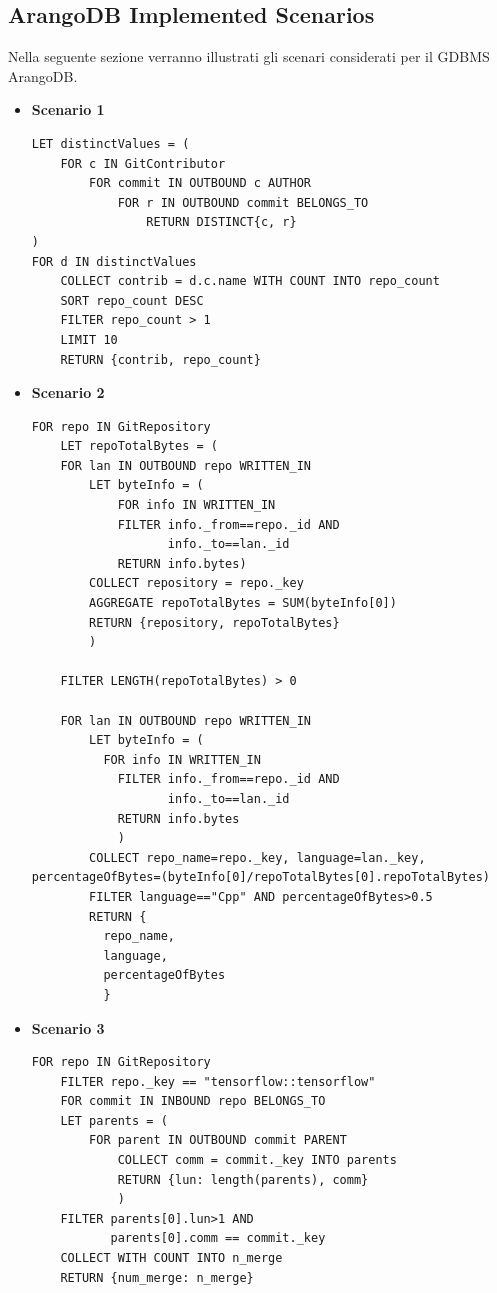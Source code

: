 \documentclass[11pt]{article}
\begin{document}
\subsection{ArangoDB Implemented Scenarios}
Nella seguente sezione verranno illustrati gli scenari considerati per il GDBMS ArangoDB. 
\begin{itemize}
    \item \textbf{Scenario 1}
    \begin{lstlisting}[style = all, style = ArangoStyle] 
LET distinctValues = (
    FOR c IN GitContributor
        FOR commit IN OUTBOUND c AUTHOR
            FOR r IN OUTBOUND commit BELONGS_TO
                RETURN DISTINCT{c, r}
)
FOR d IN distinctValues
    COLLECT contrib = d.c.name WITH COUNT INTO repo_count
    SORT repo_count DESC
    FILTER repo_count > 1
    LIMIT 10
    RETURN {contrib, repo_count}
    \end{lstlisting}

    \item \textbf{Scenario 2}
    \begin{lstlisting}[style = all, style = ArangoStyle] 
FOR repo IN GitRepository
    LET repoTotalBytes = (
    FOR lan IN OUTBOUND repo WRITTEN_IN
        LET byteInfo = (
            FOR info IN WRITTEN_IN
            FILTER info._from==repo._id AND 
                   info._to==lan._id
            RETURN info.bytes)
        COLLECT repository = repo._key
        AGGREGATE repoTotalBytes = SUM(byteInfo[0])
        RETURN {repository, repoTotalBytes}
        )
    
    FILTER LENGTH(repoTotalBytes) > 0 
    
    FOR lan IN OUTBOUND repo WRITTEN_IN
        LET byteInfo = (
          FOR info IN WRITTEN_IN
            FILTER info._from==repo._id AND 
                   info._to==lan._id
            RETURN info.bytes
            )
        COLLECT repo_name=repo._key, language=lan._key, percentageOfBytes=(byteInfo[0]/repoTotalBytes[0].repoTotalBytes)
        FILTER language=="Cpp" AND percentageOfBytes>0.5
        RETURN {
          repo_name, 
          language,
          percentageOfBytes
          }
    \end{lstlisting}
    \newpage
    \item \textbf{Scenario 3}
    \begin{lstlisting}[style = all, style = ArangoStyle] 
FOR repo IN GitRepository
    FILTER repo._key == "tensorflow::tensorflow"
    FOR commit IN INBOUND repo BELONGS_TO
    LET parents = ( 
        FOR parent IN OUTBOUND commit PARENT
            COLLECT comm = commit._key INTO parents
            RETURN {lun: length(parents), comm}
            )
    FILTER parents[0].lun>1 AND 
           parents[0].comm == commit._key
    COLLECT WITH COUNT INTO n_merge
    RETURN {num_merge: n_merge}
\end{lstlisting}


\end{itemize}
\end{document}
